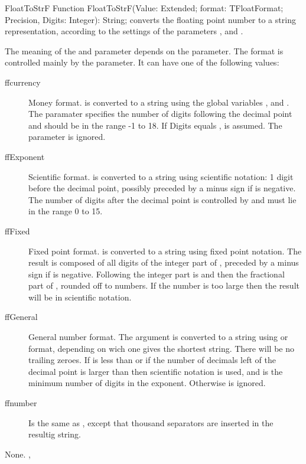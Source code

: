 \begin{function}{FloatToStrF}
\Declaration
Function FloatToStrF(Value: Extended; format: TFloatFormat; Precision, Digits: Integer): String;
\Description
{} converts the floating point number  to a string
representation, according to the settings of the parameters ,
 and .

The meaning of the  and  parameter depends on the
 parameter. The format is controlled mainly by the  
parameter. It can have one of the following values:
\begin{description}
\item[ffcurrency] Money format.  is converted to a string using
the global variables ,  and
. The  paramater specifies the number of digits
following the decimal point and should be in the range -1 to 18. If Digits
equals ,  is assumed. The  parameter is ignored.
%
\item[ffExponent] Scientific format.  is converted to a 
string using scientific notation: 1 digit before the decimal point, possibly 
preceded by a minus sign if  is negative. The number of
digits after the decimal point is controlled by  and must lie
in the range 0 to 15.  
%
\item[ffFixed] Fixed point format.  is converted to a string
using fixed point notation. The result is composed of all digits of the 
integer part of , preceded by a minus sign if  is
negative. Following the integer part is  and then the
fractional part of , rounded off to  numbers.
If the number is too large then the result will be in scientific notation.
%
\item[ffGeneral] General number format. The argument is converted to a
string using  or  format, depending on wich one
gives the shortest string. There will be no trailing zeroes. If 
is less than  or if the number of decimals left of the decimal
point is larger than  then scientific notation is used, and
 is the minimum number of digits in the exponent. Otherwise
 is ignored.
\item[ffnumber] Is the same as , except that thousand separators
are inserted in the resultig string.
\end{description}
\Errors
None.
\SeeAlso
{}, 
\end{function}

